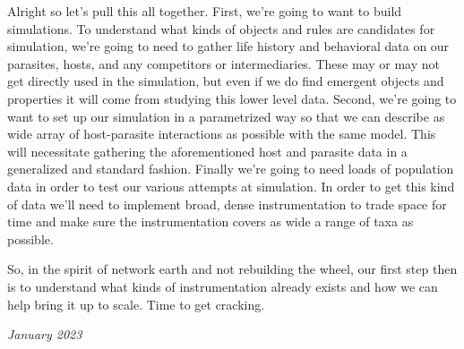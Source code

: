 \documentclass[11pt,a5paper]{book}
\begin{document}
Alright so let's pull this all together. First, we're going to want to build simulations. To understand what kinds of objects and rules are candidates for simulation, we're going to need to gather life history and behavioral data on our parasites, hosts, and any competitors or intermediaries. These may or may not get directly used in the simulation, but even if we do find emergent objects and properties it will come from studying this lower level data. Second, we're going to want to set up our simulation in a parametrized way so that we can describe as wide array of host-parasite interactions as possible with the same model. This will necessitate gathering the aforementioned host and parasite data in a generalized and standard fashion. Finally we're going to need loads of population data in order to test our various attempts at simulation. In order to get this kind of data we'll need to implement broad, dense instrumentation to trade space for time and make sure the instrumentation covers as wide a range of taxa as possible. 
\newline

So, in the spirit of network earth and not rebuilding the wheel, our first step then is to understand what kinds of instrumentation already exists and how we can help bring it up to scale. Time to get cracking.
\newline

\textit{January 2023}



\end{document}
